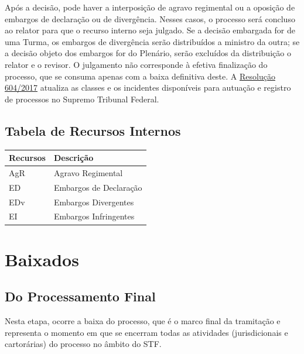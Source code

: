 \documentclass[
]{book}
\begin{document}
Após a decisão, pode haver a interposição de agravo regimental ou a oposição de embargos de declaração ou de divergência. Nesses casos, o processo será concluso ao relator para que o recurso interno seja julgado. Se a decisão embargada for de uma Turma, os embargos de divergência serão distribuídos a ministro da outra; se a decisão objeto dos embargos for do Plenário, serão excluídos da distribuição o relator e o revisor. O julgamento não corresponde à efetiva finalização do processo, que se consuma apenas com a baixa definitiva deste.
A \href{http://www.stf.jus.br/ARQUIVO/NORMA/RESOLUCAO604-2017.PDF}{Resolução 604/2017} atualiza as classes e os incidentes disponíveis para autuação e registro de processos no Supremo Tribunal Federal.

\hypertarget{tabela-de-recursos-internos}{%
\section{Tabela de Recursos Internos}\label{tabela-de-recursos-internos}}

\begin{table}[H]
\centering\begingroup\fontsize{14}{16}\selectfont

\begin{tabular}{l|l}
\hline
Recursos & Descrição\\
\hline
AgR & Agravo Regimental\\
\hline
ED & Embargos de Declaração\\
\hline
EDv & Embargos Divergentes\\
\hline
EI & Embargos Infringentes\\
\hline
\end{tabular}
\endgroup{}
\end{table}

\hypertarget{baixados}{%
\chapter{Baixados}\label{baixados}}

\hypertarget{do-processamento-final}{%
\section{Do Processamento Final}\label{do-processamento-final}}

Nesta etapa, ocorre a baixa do processo, que é o marco final da tramitação e representa o momento em que se encerram todas as atividades (jurisdicionais e cartorárias) do processo no âmbito do STF.
\end{document}
